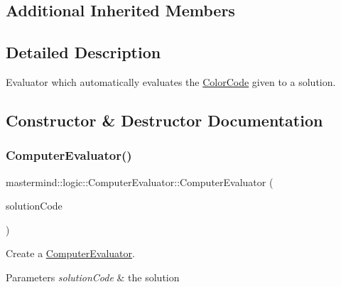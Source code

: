 \subsection*{Additional Inherited Members}


\subsection{Detailed Description}
Evaluator which automatically evaluates the \hyperlink{classmastermind_1_1logic_1_1_color_code}{Color\+Code} given to a solution. 

\subsection{Constructor \& Destructor Documentation}
\hypertarget{classmastermind_1_1logic_1_1_computer_evaluator_a63c369068472dc8117552f991bd37a7a}{}\label{classmastermind_1_1logic_1_1_computer_evaluator_a63c369068472dc8117552f991bd37a7a} 
\subsubsection{\texorpdfstring{Computer\+Evaluator()}{ComputerEvaluator()}}
{\footnotesize\ttfamily mastermind\+::logic\+::\+Computer\+Evaluator\+::\+Computer\+Evaluator (\begin{DoxyParamCaption}\item[{\hyperlink{classmastermind_1_1logic_1_1_color_code}{Color\+Code}}]{solution\+Code }\end{DoxyParamCaption})}



Create a \hyperlink{classmastermind_1_1logic_1_1_computer_evaluator}{Computer\+Evaluator}. 


\begin{DoxyParams}{Parameters}
{\em solution\+Code} & the solution \\
\hline
\end{DoxyParams}
\hypertarget{classmastermind_1_1logic_1_1_computer_evaluator_aa216efb1cb2e885562d01b76751c84be}{}\label{classmastermind_1_1logic_1_1_computer_evaluator_aa216efb1cb2e885562d01b76751c84be} 
